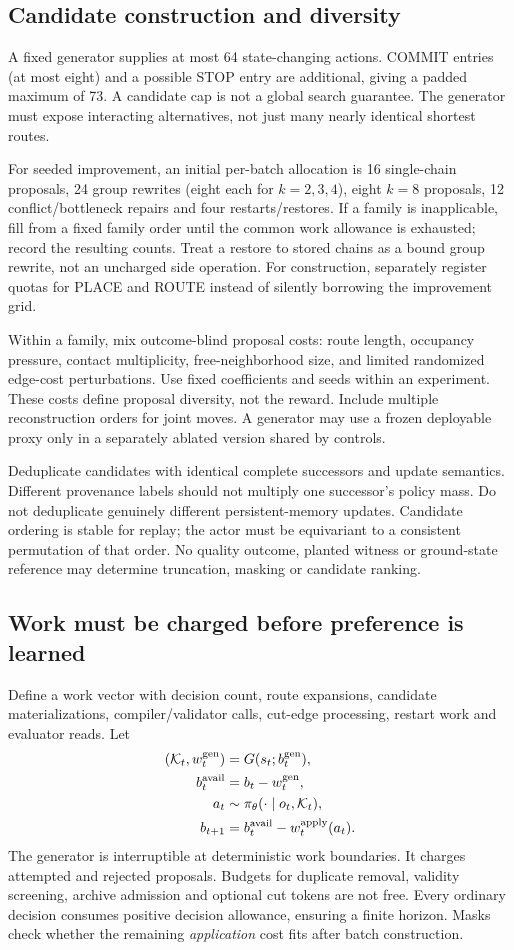 \documentclass[11pt,a4paper]{article}
\theoremstyle{definition}\newtheorem{definition}[proposition]{Definition}
\begin{document}
\subsection{Candidate construction and diversity}
A fixed generator supplies at most 64 state-changing actions. COMMIT entries (at most eight) and a possible STOP entry are additional, giving a padded maximum of 73. A candidate cap is not a global search guarantee. The generator must expose interacting alternatives, not just many nearly identical shortest routes.

For seeded improvement, an initial per-batch allocation is 16 single-chain proposals, 24 group rewrites (eight each for $k=2,3,4$), eight $k=8$ proposals, 12 conflict/bottleneck repairs and four restarts/restores. If a family is inapplicable, fill from a fixed family order until the common work allowance is exhausted; record the resulting counts. Treat a restore to stored chains as a bound group rewrite, not an uncharged side operation. For construction, separately register quotas for PLACE and ROUTE instead of silently borrowing the improvement grid.

Within a family, mix outcome-blind proposal costs: route length, occupancy pressure, contact multiplicity, free-neighborhood size, and limited randomized edge-cost perturbations. Use fixed coefficients and seeds within an experiment. These costs define proposal diversity, not the reward. Include multiple reconstruction orders for joint moves. A generator may use a frozen deployable proxy only in a separately ablated version shared by controls.

Deduplicate candidates with identical complete successors and update semantics. Different provenance labels should not multiply one successor's policy mass. Do not deduplicate genuinely different persistent-memory updates. Candidate ordering is stable for replay; the actor must be equivariant to a consistent permutation of that order. No quality outcome, planted witness or ground-state reference may determine truncation, masking or candidate ranking.

\subsection{Work must be charged before preference is learned}
Define a work vector with decision count, route expansions, candidate materializations, compiler/validator calls, cut-edge processing, restart work and evaluator reads. Let
\begin{align}
(\mathcal K_t,w_t^{\rm gen})&=G(s_t;b_t^{\rm gen}),\\
b_t^{\rm avail}&=b_t-w_t^{\rm gen},\\
a_t&\sim\pi_\theta(\cdot\mid o_t,\mathcal K_t),\\
b_{t+1}&=b_t^{\rm avail}-w_t^{\rm apply}(a_t).
\end{align}
The generator is interruptible at deterministic work boundaries. It charges attempted and rejected proposals. Budgets for duplicate removal, validity screening, archive admission and optional cut tokens are not free. Every ordinary decision consumes positive decision allowance, ensuring a finite horizon. Masks check whether the remaining \emph{application} cost fits after batch construction.
\end{document}
